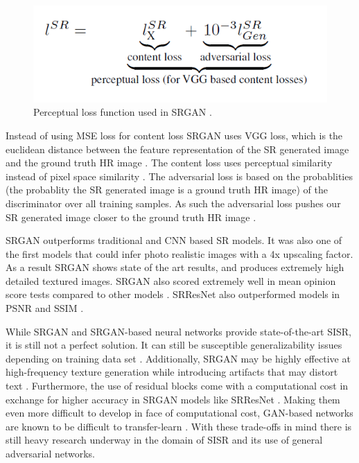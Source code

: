 \documentclass[11pt,titlepage]{article}
\begin{document}
\begin{figure}[hp]
  \centering
  \includegraphics[width=0.8\linewidth]{perceptual_loss.png}
  \caption{Perceptual loss function used in SRGAN \cite{Hui2018}.}
  \label{fig:srgan}
\end{figure}

Instead of using MSE loss for content loss SRGAN uses VGG loss, which is the euclidean distance between the feature representation of the SR generated image and the ground truth HR image \cite{Hui2018}. The content loss uses perceptual similarity instead of pixel space similarity \cite{Hui2018}. The adversarial loss is based on the probablities (the probablity the SR generated image is a ground truth HR image) of the discriminator over all training samples. As such the adversarial loss pushes our SR generated image closer to the ground truth HR image \cite{Hui2018}.


\bigskip

SRGAN outperforms traditional and CNN based SR models. It was also one of the first models that could infer photo realistic images with a 4x upscaling factor. As a result SRGAN shows state of the art results, and produces extremely high detailed textured images. SRGAN also scored extremely well in mean opinion score tests compared to other models \cite{Tsang2020}. SRResNet also outperformed models in PSNR and SSIM \cite{Tsang2020}.

\bigskip

While SRGAN and SRGAN-based neural networks provide state-of-the-art SISR, it is still not a perfect solution. It can still be susceptible generalizability issues depending on training data set \cite{Tsang2020}. Additionally, SRGAN may be highly effective at high-frequency texture generation while introducing artifacts that may distort text \cite{Kanska2017}. Furthermore, the use of residual blocks come with a computational cost in exchange for higher accuracy in SRGAN models like SRResNet \cite{Kanska2017}. Making them even more difficult to develop in face of computational cost, GAN-based networks are known to be difficult to transfer-learn \cite{frégier2020mind2mind}. With these trade-offs in mind there is still heavy research underway in the domain of SISR and its use of general adversarial networks.
\end{document}
